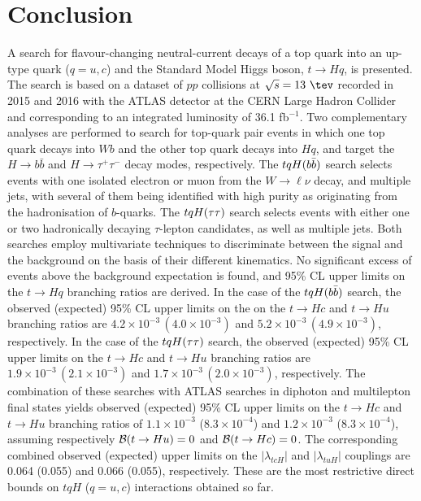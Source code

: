 \section{Conclusion}
\label{sec:conclusion}

A search for flavour-changing neutral-current decays of a top quark into an up-type quark ($q=u, c$) and the Standard Model Higgs boson, $t\to Hq$, is presented. 
The search is based on a dataset of $pp$ collisions at $\sqrt{s}=13~\tev$ recorded in 2015 and 2016 with the ATLAS detector at the 
CERN Large Hadron Collider and corresponding to an integrated luminosity of 36.1 fb$^{-1}$.
Two complementary analyses are performed to search for top-quark pair events in which one top quark decays into $Wb$ and the other top quark decays into $Hq$,
and target the $H \to b\bar{b}$ and $H \to \tau^+\tau^-$  decay modes, respectively.  
The $tqH(b\bar{b})$ search selects events with one isolated electron or muon from the $W \to \ell\nu$ decay, and multiple jets, with several 
of them being identified with high purity as originating from the hadronisation of $b$-quarks. 
The $tqH(\tau\tau)$ search selects events with either one or two hadronically decaying $\tau$-lepton candidates, as well as multiple jets. 
Both searches employ multivariate techniques to discriminate between the signal and the background on the basis of their different kinematics. 
No significant excess of events above the background expectation is found, and 95\% CL upper limits on the $t\to Hq$ branching ratios are derived.
In the case of the $tqH(b\bar{b})$ search, the observed (expected) 95\% CL upper limits on the on the $t\to Hc$ and $t\to Hu$ branching ratios 
are $4.2 \times 10^{-3}\,(4.0 \times 10^{-3})$ and $5.2 \times 10^{-3}\,(4.9 \times 10^{-3})$, respectively.
In the case of the $tqH(\tau\tau)$ search, the observed (expected) 95\% CL upper limits on the $t\to Hc$ and $t\to Hu$ branching ratios 
are $1.9 \times 10^{-3}\,(2.1 \times 10^{-3})$ and $1.7 \times 10^{-3}\,(2.0 \times 10^{-3})$, respectively.
The combination of these searches with ATLAS searches in diphoton and multilepton final states 
yields observed (expected) 95\% CL upper limits on the $t\to Hc$ and $t\to Hu$ branching ratios of $1.1 \times 10^{-3}$ ($8.3 \times 10^{-4}$) 
and $1.2 \times 10^{-3}$ ($8.3 \times 10^{-4}$), assuming respectively $\mathcal{B}(t\to Hu)=0$ and $\mathcal{B}(t\to Hc)=0$.
The corresponding combined observed (expected) upper limits on the $|\lambda_{tcH}|$ and $|\lambda_{tuH}|$ couplings are 0.064 (0.055) and 0.066 (0.055), respectively. 
These are the most restrictive direct bounds on $tqH$ ($q=u,c$) interactions obtained so far.
